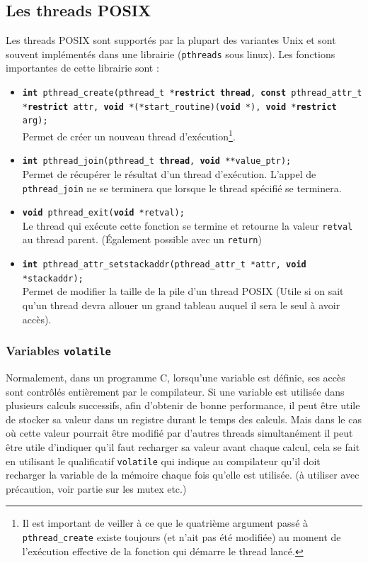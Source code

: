 \subsection{Les threads POSIX}
Les threads POSIX sont supportés par la plupart des variantes Unix et sont souvent implémentés dans une librairie (\texttt{pthreads} sous linux).
Les fonctions importantes de cette librairie sont :
\begin{itemize}
  \item \texttt{\textbf{int} pthread\_create(pthread\_t *\textbf{restrict thread}, \textbf{const} pthread\_attr\_t *\textbf{restrict} attr, \textbf{void} *(*start\_routine)(\textbf{void} *), \textbf{void} *\textbf{restrict} arg);}\\
    Permet de créer un nouveau thread d'exécution\footnote{Il est important de veiller à ce que le quatrième argument passé à \texttt{pthread\_create} existe toujours (et n'ait pas été modifiée) au moment de l'exécution effective de la fonction qui démarre le thread lancé.
    }.
  \item \texttt{\textbf{int} pthread\_join(pthread\_t \textbf{thread}, \textbf{void} **value\_ptr);}\\
    Permet de récupérer le résultat d'un thread d'exécution.
    L'appel de \texttt{pthread\_join} ne se terminera que lorsque le thread spécifié se terminera.
  \item \texttt{\textbf{void} pthread\_exit(\textbf{void} *retval);}\\
    Le thread qui exécute cette fonction se termine et retourne la valeur \texttt{retval} au thread parent.
    (Également possible avec un \texttt{return})
  \item \texttt{\textbf{int} pthread\_attr\_setstackaddr(pthread\_attr\_t *attr, \textbf{void} *stackaddr); }\\
    Permet de modifier la taille de la pile d'un thread POSIX (Utile si on sait qu'un thread devra allouer un grand tableau auquel il sera le seul à avoir accès).
\end{itemize}

\subsubsection{Variables \texttt{volatile}}
Normalement, dans un programme C, lorsqu'une variable est définie, ses accès sont contrôlés entièrement par le compilateur.
Si une variable est utilisée dans plusieurs calculs successifs, afin d'obtenir de bonne performance, il peut être utile de stocker sa valeur dans un registre durant le temps des calculs.
Mais dans le cas où cette valeur pourrait être modifié par d'autres threads simultanément il peut être utile d'indiquer qu'il faut recharger sa valeur avant chaque calcul, cela se fait en utilisant le qualificatif \texttt{volatile} qui indique au compilateur qu'il doit recharger la variable de la mémoire chaque fois qu'elle est utilisée.
(à utiliser avec précaution, voir partie sur les mutex etc.)

